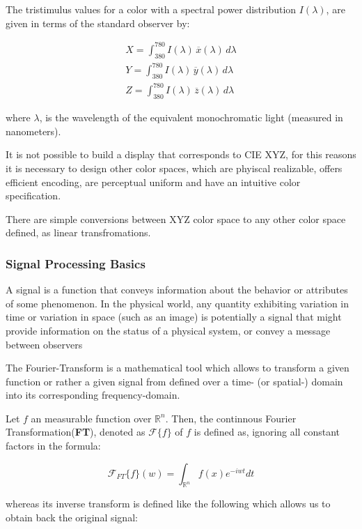 The tristimulus values for a color with a spectral power distribution $I(\lambda)$, are given in terms of the standard observer by:

\begin{align*}
    X= \int_{380}^{780} I(\lambda)\,\overline{x}(\lambda)\,d\lambda \\
    Y= \int_{380}^{780} I(\lambda)\,\overline{y}(\lambda)\,d\lambda \\
    Z= \int_{380}^{780} I(\lambda)\,\overline{z}(\lambda)\,d\lambda
\end{align*}

where $\lambda$, is the wavelength of the equivalent monochromatic light (measured in nanometers).

It is not possible to build a display that corresponds to CIE XYZ, for this reasons it is necessary to design  other color spaces, which are phyiscal realizable, offers efficient encoding, are perceptual uniform and have an intuitive color specification. 

There are simple conversions between XYZ color space to any other color space defined, as linear transfromations.


\subsubsection{Signal Processing Basics}
A signal is a function that conveys information about the behavior or attributes of some phenomenon.
In the physical world, any quantity exhibiting variation in time or variation in space (such as an image) is potentially a signal that might provide information on the status of a physical system, or convey a message between observers

The Fourier-Transform is a mathematical tool which allows to transform a given function or rather a given signal from defined over a time- (or spatial-) domain into its corresponding frequency-domain.
 
Let $f$ an measurable function over $\mathds{R}^n$. Then, the continnous Fourier Transformation(\textbf{FT}), denoted as $\mathcal{F}\{f\}$ of $f$ is defined as, ignoring all constant factors in the formula:
 
\begin{equation}
  \mathcal{F}_{FT}\{f\}(w) = \int_{\mathds{R}^n} f(x)e^{-iwt} dt
\end{equation}

whereas its inverse transform is defined like the following which allows us to obtain back the original signal:

